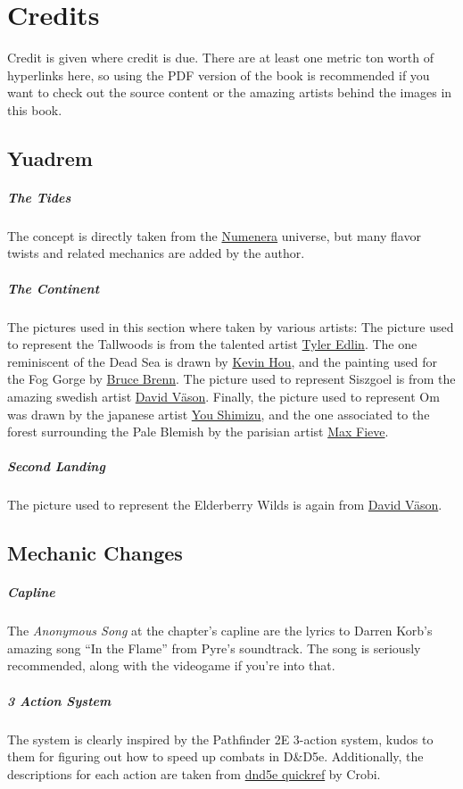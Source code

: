 \section{Credits}
\begin{linenumbers}
Credit is given where credit is due.
There are at least one metric ton worth of hyperlinks here, so using the PDF version of the book is recommended if you want to check out the source content or the amazing artists behind the images in this book.

\subsection*{Yuadrem}
\subparagraph{The Tides} The concept is directly taken from the \href{http://numenera.com/}{Numenera} universe, but many flavor twists and related mechanics are added by the author.

\subparagraph{The Continent} The pictures used in this section where taken by various artists:
The picture used to represent the Tallwoods is from the talented artist \href{https://www.artstation.com/tyleredlinart}{Tyler Edlin}.
The one reminiscent of the Dead Sea is drawn by \href{https://www.artstation.com/knightblur}{Kevin Hou}, and the painting used for the Fog Gorge by \href{https://www.artstation.com/brucebrenn}{Bruce Brenn}.
The picture used to represent Siszgoel is from the amazing swedish artist \href{https://www.artstation.com/davidvason}{David V\"ason}.
Finally, the picture used to represent Om was drawn by the japanese artist \href{https://www.pixiv.net/en/users/2830609}{You Shimizu}, and the one associated to the forest surrounding the Pale Blemish by the parisian artist \href{https://www.artstation.com/maxfieve}{Max Fieve}.

\subparagraph{Second Landing} The picture used to represent the Elderberry Wilds is again from \href{https://www.artstation.com/davidvason}{David V\"ason}.

\subsection*{Mechanic Changes}
\subparagraph{Capline} The \textit{Anonymous Song} at the chapter's capline are the lyrics to Darren Korb's amazing song ``In the Flame'' from Pyre's soundtrack.
The song is seriously recommended, along with the videogame if you're into that.

\subparagraph{3 Action System} The system is clearly inspired by the Pathfinder 2E 3-action system, kudos to them for figuring out how to speed up combats in D\&D5e.
Additionally, the descriptions for each action are taken from \href{https://crobi.github.io/dnd5e-quickref/}{dnd5e quickref} by Crobi.


\end{linenumbers}
